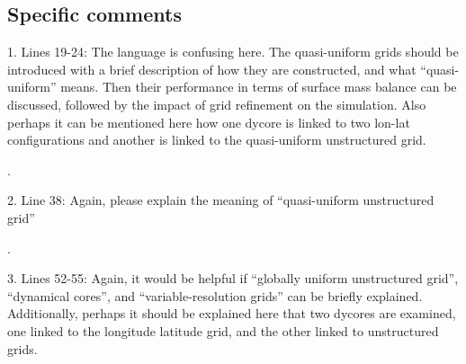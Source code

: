 \documentclass[12pt,oneside,a4paper]{article}%
\begin{document}



\subsection*{Specific comments}

1. Lines 19-24: The language is confusing here. The quasi-uniform grids should be introduced with a brief description of how they are constructed, and what “quasi- uniform” means. Then their performance in terms of surface mass balance can be discussed, followed by the impact of grid refinement on the simulation. Also perhaps it can be mentioned here how one dycore is linked to two lon-lat configurations and another is linked to the quasi-uniform unstructured grid. \newline

{\color{blue}{We agree that this is confusing and have added a sentence describing the different grids/dycores in more detail, before talking about their SMB performance.}}.

2. Line 38: Again, please explain the meaning of “quasi-uniform unstructured grid”  \newline

{\color{blue}{See above.}}.

3. Lines 52-55: Again, it would be helpful if “globally uniform unstructured grid”, “dynamical cores”, and “variable-resolution grids” can be briefly explained. Additionally, perhaps it should be explained here that two dycores are examined, one linked to the longitude latitude grid, and the other linked to unstructured grids.  \newline
\end{document}
